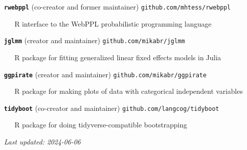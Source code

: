 \documentclass[11pt,]{article}
\begin{document}
\textbf{\texttt{rwebppl}} (co-creator and former maintainer)
\hfill \texttt{github.com/mhtess/rwebppl}\\
\strut ~~~R interface to the WebPPL probabilistic programming language

\textbf{\texttt{jglmm}} (creator and maintainer)
\hfill \texttt{github.com/mikabr/jglmm}\\
\strut ~~~R package for fitting generalized linear fixed effects models
in Julia

\textbf{\texttt{ggpirate}} (creator and maintainer)
\hfill \texttt{github.com/mikabr/ggpirate}\\
\strut ~~~R package for making plots of data with categorical
independent variables

\textbf{\texttt{tidyboot}} (co-creator and maintainer)
\hfill \texttt{github.com/langcog/tidyboot}\\
\strut ~~~R package for doing tidyverse-compatible bootstrapping

\centering
\vspace{2em}

\emph{Last updated: 2024-06-06}
\end{document}
